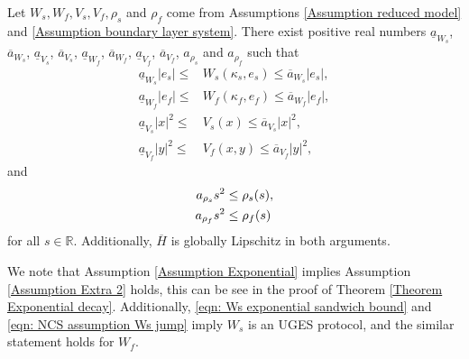\begin{assum}
    Let $W_s, W_f, V_s, V_f, \rho_s$ and $\rho_f$ come from Assumptions \ref{Assumption reduced model} and \ref{Assumption boundary layer system}. There exist positive real numbers $\underline{a}_{W_s}$, $\overline{a}_{W_s}$, $\underline{a}_{V_s}$, $\overline{a}_{V_s}$, $\underline{a}_{W_f}$, $\overline{a}_{W_f}$, $\underline{a}_{V_f}$, $\overline{a}_{V_f}$, $a_{\rho_s}$ and $a_{\rho_f}$ such that 
    \begin{subequations}
        \begin{align}
            \underline{a}_{W_s} |e_s| \leq & W_s(\kappa_s, e_s) \leq \overline{a}_{W_s} |e_s|, \label{eqn: Ws exponential sandwich bound} \\
            \underline{a}_{W_f} |e_f| \leq & W_f(\kappa_f, e_f) \leq \overline{a}_{W_f} |e_f|, \label{eqn: Wf exponential sandwich bound} \\
            \underline{a}_{V_s} |x|^2 \leq &V_s(x) \leq \overline{a}_{V_s} |x|^2, \label{eqn: Vs exponential sandwich bound}\\
            \underline{a}_{V_f} |y|^2 \leq &V_f(x,y) \leq \overline{a}_{V_f} |y|^2, \label{eqn: Vf exponential sandwich bound}%
        \end{align}
    \end{subequations}
 and \vspace{-0.5cm}
\begin{subequations}
\begin{align}
    a_{\rho_s}s^2 &\leq \rho_s(s), \label{eqn: a_{rho_s}}
    \\
    a_{\rho_f}s^2 &\leq \rho_f(s)\label{eqn: a_{rho_f}}
    \end{align}
\end{subequations}
for all $s\in \mathbb{R}$. Additionally, $\overline{H}$ is globally Lipschitz in both arguments.
\label{Assumption Exponential}
\end{assum}
%
We note that Assumption \ref{Assumption Exponential} implies Assumption \ref{Assumption Extra 2} holds, this can be see in the proof of Theorem \ref{Theorem Exponential decay}. Additionally, \eqref{eqn: Ws exponential sandwich bound} and \eqref{eqn: NCS assumption Ws jump} imply $W_s$ is an UGES protocol, and the similar statement holds for $W_f$.














